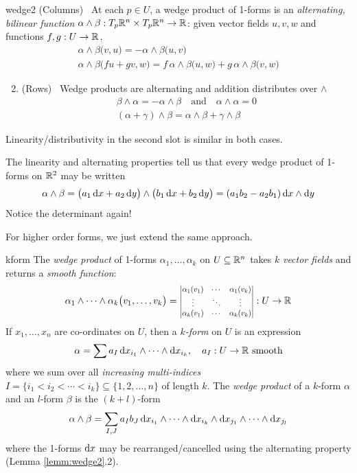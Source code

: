 \begin{lemm}{}{wedge2}
\exstart (Columns) \ At each $p\in U$, a wedge product of 1-forms is an \emph{alternating, bilinear function} $\alpha\wedge\beta:T_p\mathbb{R}^n\times T_p\mathbb{R}^n\to \mathbb{R}$: given vector fields $u,v,w$ and functions $f,g:U\to\mathbb{R}$,
\begin{gather*}
\alpha\wedge\beta\bigl(v,u\bigr)=-\alpha\wedge\beta\bigl(u,v\bigr)\tag{alternating}\\[5pt]
\alpha\wedge\beta\bigl(fu+gv,w\bigr)=f\,\alpha\wedge\beta\bigl(u,w\bigr)+g\,\alpha\wedge\beta\bigl(v,w\bigr)\tag{linear in 1\st\ slot}
\end{gather*}
\begin{enumerate}\setcounter{enumi}{1}
  \item (Rows) \ Wedge products are alternating and addition distributes over $\wedge$
  \begin{gather*}
  \beta\wedge\alpha=-\alpha\wedge\beta\quad \text{and}\quad \alpha\wedge\alpha=0\tag{alternating}\\
	(\alpha+\gamma)\wedge\beta=\alpha\wedge\beta+\gamma\wedge\beta\tag{distributivity in 1\st\ slot}
  \end{gather*}
\end{enumerate}
Linearity/distributivity in the second slot is similar in both cases.
\end{lemm}

The linearity and alternating properties tell us that every wedge product of 1-forms on $\mathbb{R}^2$ may be written
\[\alpha\wedge\beta=\bigl(a_1\,{\mathrm{d} x}+a_2\,{\mathrm{d} y}\bigr)\wedge\bigl(b_1\,{\mathrm{d} x}+b_2\,{\mathrm{d} y}\bigr) =(a_1b_2-a_2b_1)\,{\mathrm{d} x}\wedge{\mathrm{d}y}\]
Notice the determinant again!\smallbreak

For higher order forms, we just extend the same approach.

\begin{defn}{}{kform}
The \emph{wedge product} of 1-forms $\alpha_1,\ldots,\alpha_k$ on $U\subseteq\mathbb{R}^n$ takes $k$ \emph{vector fields} and returns a \emph{smooth function}:\vspace{-5pt}
\[\alpha_1\wedge\cdots\wedge\alpha_k\bigl(v_1,\ldots,v_k\bigr)=
\scalebox{0.8}{$\begin{vmatrix}
\alpha_1(v_1)&\cdots&\alpha_1(v_k)\\
\vdots&\ddots&\vdots\\
\alpha_k(v_1)&\cdots&\alpha_k(v_k)
\end{vmatrix}$}:U\to\R\vspace{-5pt}\]
If $x_1,\ldots,x_n$ are co-ordinates on $U$, then a \emph{$k$-form} on $U$ is an expression
\[\alpha=\sum a_I\,{\mathrm{d} x}_{i_1}\wedge\cdots\wedge{\mathrm{d}x}_{i_k},\quad a_I:U\to\mathbb{R}\text{ smooth}\]
where we sum over all \emph{increasing multi-indices} $I=\{i_1<i_2<\cdots< i_k\}\subseteq\{1,2,\ldots,n\}$ of length $k$.\smallbreak
The \emph{wedge product} of a $k$-form $\alpha$ and an $l$-form $\beta$ is the $(k+l)$-form 
\[\alpha\wedge \beta=\sum_{I,J}a_Ib_J\,{\mathrm{d} x}_{i_1}\wedge\cdots\wedge{\mathrm{d}x}_{i_k}\wedge{\mathrm{d}x}_{j_1}\wedge\cdots\wedge{\mathrm{d}x}_{j_l}\]
where the 1-forms ${\mathrm{d} x}$ may be rearranged/cancelled using the alternating property (Lemma \ref{lemm:wedge2}.2).
\end{defn}

